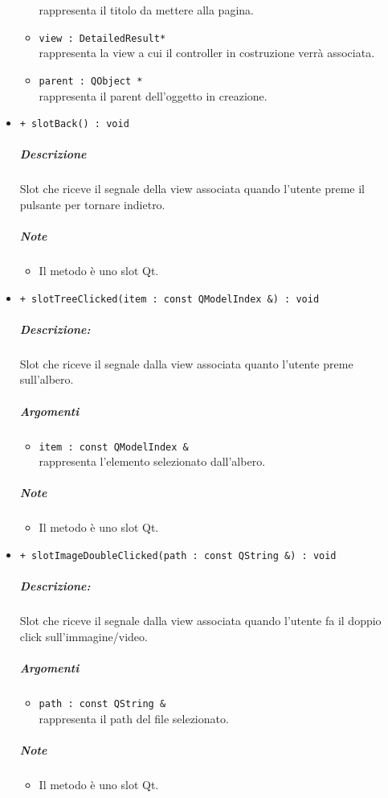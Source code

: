 \begin{itemize}
\begin{itemize}
\color{black} rappresenta il titolo da mettere alla pagina.
				\item \color{RoyalPurple} \verb!view : DetailedResult*!\\				
\color{black} rappresenta la view a cui il controller in costruzione verrà associata.
				\item \color{RoyalPurple} \verb!parent : QObject *!\\				
\color{black} rappresenta il parent dell'oggetto in creazione.
			\end{itemize}
			\item \color{blue} \verb!+ slotBack() : void!
			\color{black}
			\subparagraph{Descrizione} Slot\g{} che riceve il segnale della view associata quando l'utente preme il pulsante per tornare indietro.
			\subparagraph{Note}
			\begin{itemize}
				\item Il metodo è uno slot\g{} Qt\g{}.
			\end{itemize}
			\item \color{blue} \verb!+ slotTreeClicked(item : const QModelIndex &) : void!
			\color{black}
			\subparagraph{Descrizione:} Slot\g{} che riceve il segnale dalla view associata quanto l'utente preme sull'albero.
			\color{black}
			\subparagraph{Argomenti}
			\begin{itemize}
				\item \color{RoyalPurple} \verb!item : const QModelIndex &!\\				
\color{black} rappresenta l'elemento selezionato dall'albero.
			\end{itemize}
			\subparagraph{Note}
			\begin{itemize}
				\item Il metodo è uno slot\g{} Qt\g{}.
			\end{itemize}
			\item \color{blue} \verb!+ slotImageDoubleClicked(path : const QString &) : void!
			\color{black}
			\subparagraph{Descrizione:} Slot\g{} che riceve il segnale dalla view associata quando l'utente fa il doppio click sull'immagine/video.
			\color{black}
			\subparagraph{Argomenti}
			\begin{itemize}
				\item \color{RoyalPurple} \verb!path : const QString &!\\				
\color{black} rappresenta il path del file selezionato.
			\end{itemize}
			\subparagraph{Note}
			\begin{itemize}
				\item Il metodo è uno slot\g{} Qt\g{}.
			\end{itemize}
		\end{itemize}
